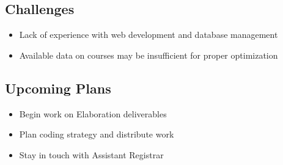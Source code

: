 \documentclass[11pt]{article}
\begin{document}
\subsection{Challenges} %
\begin{itemize}
\item Lack of experience with web development and database management
\item Available data on courses may be insufficient for proper optimization
\end{itemize}

\subsection{Upcoming Plans}
\begin{itemize}
\item Begin work on Elaboration deliverables
\item Plan coding strategy and distribute work
\item Stay in touch with Assistant Registrar
\end{itemize}
\end{document}
